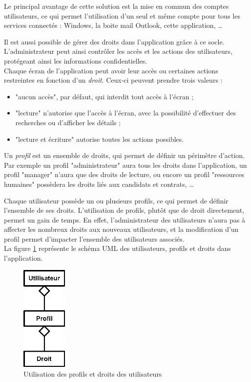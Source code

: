 Le principal avantage de cette solution est la mise en commun des comptes utilisateurs, ce qui permet l'utilisation d'un seul et même compte pour tous les services connectés : Windows, la boite mail Outlook, cette application, \ldots



Il est aussi possible de gérer des droits dans l'application grâce à ce socle.
L'administrateur peut ainsi contrôler les accès et les actions des utilisateurs, protégeant ainsi les informations confidentielles.
\\

Chaque écran de l'application peut avoir leur accès ou certaines actions restreintes en fonction d'un \textit{droit}.
Ceux-ci peuvent prendre trois valeurs : 
\begin{itemize}
	\item "aucun accès", par défaut, qui interdit tout accès à l'écran ;
	\item "lecture" n'autorise que l'accès à l'écran, avec la possibilité d'effectuer des recherches ou d'afficher les détails ;
	\item "lecture et écriture" autorise toutes les actions possibles.
\end{itemize}

Un \textit{profil} est un ensemble de droits, qui permet de définir un périmètre d'action.
Par exemple un profil "administrateur" aura tous les droits dans l'application, un profil "manager" n'aura que des droits de lecture, ou encore un profil "ressources humaines" possèdera les droits liés aux candidats et contrats, \ldots

Chaque utilisateur possède un ou plusieurs profils, ce qui permet de définir l'ensemble de ses droits.
L'utilisation de profils, plutôt que de droit directement, permet un gain de temps.
En effet, l'administrateur des utilisateurs n'aura pas à affecter les nombreux droits aux nouveaux utilisateurs, et la modification d'un profil permet d'impacter l'ensemble des utilisateurs associés.
\\

La figure \ref{utilisateur_profils_droits} représente le schéma UML des utilisateurs, profils et droits dans l'application.
\begin{figure}[!h]
	\center
	\includegraphics[width=0.2\textwidth]{img/utilisateur_profils_droits.png}
	\caption{Utilisation des profils et droits des utilisateurs}
	\label{utilisateur_profils_droits}
\end{figure}


